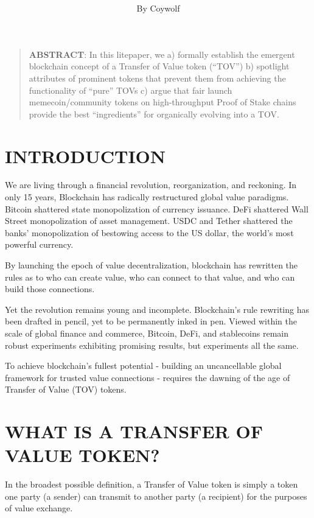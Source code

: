 \documentclass{article}
\title{\makebox[\textwidth][c]{\textbf{Transfer of Value (TOV) Tokens:}} \newline \makebox[\textwidth][c]{\textbf{From Meme to Money}}}
\author{By Coywolf}
\date{}
\begin{document}
\maketitle

\begin{quote}
\textbf{ABSTRACT}: In this litepaper, we a) formally establish the emergent blockchain concept of a Transfer of Value token (``TOV'') b) spotlight attributes of prominent tokens that prevent them from achieving the functionality of ``pure'' TOVs c) argue that fair launch memecoin/community tokens on high-throughput Proof of Stake chains provide the best ``ingredients'' for organically evolving into a TOV.
\end{quote}

\section*{INTRODUCTION}

We are living through a financial revolution, reorganization, and reckoning. In only 15 years, Blockchain has radically restructured global value paradigms. Bitcoin shattered state monopolization of currency issuance. DeFi shattered Wall Street monopolization of asset management. USDC and Tether shattered the banks' monopolization of bestowing access to the US dollar, the world's most powerful currency.

By launching the epoch of value decentralization, blockchain has rewritten the rules as to who can create value, who can connect to that value, and who can build those connections.

Yet the revolution remains young and incomplete. Blockchain's rule rewriting has been drafted in pencil, yet to be permanently inked in pen. Viewed within the scale of global finance and commerce, Bitcoin, DeFi, and stablecoins remain robust experiments exhibiting promising results, but experiments all the same.

To achieve blockchain's fullest potential - building an uncancellable global framework for trusted value connections - requires the dawning of the age of Transfer of Value (TOV) tokens.

\section*{WHAT IS A TRANSFER OF VALUE TOKEN?}

In the broadest possible definition, a Transfer of Value token is simply a token one party (a sender) can transmit to another party (a recipient) for the purposes of value exchange.
\end{document}
